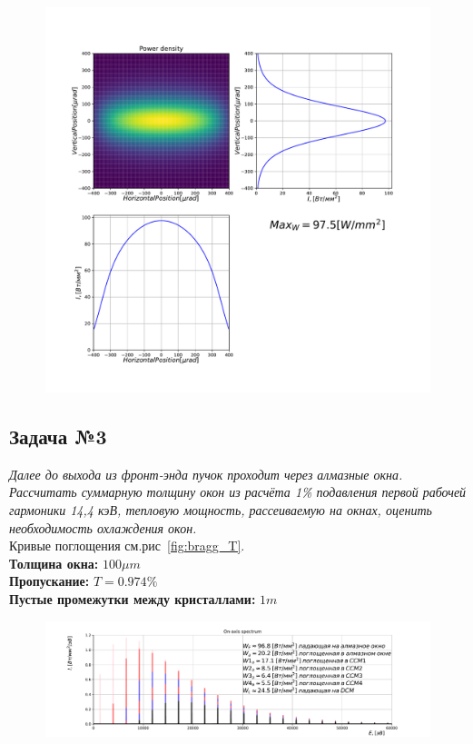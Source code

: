 \documentclass[14pt,a4paper]{extarticle}
\numberwithin{equation}{section}
\begin{document}
\begin{figure}[htbp]
\begin{minipage}{0.49\textwidth}
		\caption{}
		\label{fig:bragg_T}
	\end{minipage}    
	\begin{minipage}{1.\textwidth}
		\centering  
		\includegraphics[width=\textwidth]{pic/power_dens.pdf}
		\caption{}
		\label{fig:spec}
\end{minipage}     
\end{figure}

\subsection{Задача №3}
\textit{Далее до выхода из фронт-энда пучок проходит через алмазные окна. Рассчитать суммарную толщину окон из расчёта 1\% подавления первой рабочей гармоники 14,4 кэВ, тепловую мощность, рассеиваемую на окнах, оценить необходимость охлаждения окон.}\\
Кривые поглощения см.рис~\ref{fig:bragg_T}.\\
\textbf{Толщина окна:} $100\mu m$\\
\textbf{Пропускание:} $T = 0.974 \%$\\
\textbf{Пустые промежутки между кристаллами:} $1m$\\
\begin{figure}[htbp]
	\centering  
	\includegraphics[width=\textwidth]{pic/spec.pdf}
	\caption{}
	\label{fig:absorb_spec}
\end{figure}
\end{document}
